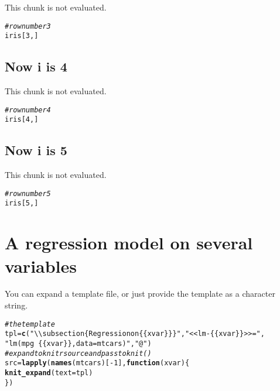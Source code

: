 \documentclass{article}\usepackage[]{graphicx}\usepackage[]{color}
\makeatletter
\newcommand{\hlnum}[1]{\textcolor[rgb]{0.686,0.059,0.569}{#1}}%
\newcommand{\hlstr}[1]{\textcolor[rgb]{0.192,0.494,0.8}{#1}}%
\newcommand{\hlcom}[1]{\textcolor[rgb]{0.678,0.584,0.686}{\textit{#1}}}%
\newcommand{\hlopt}[1]{\textcolor[rgb]{0,0,0}{#1}}%
\newcommand{\hlstd}[1]{\textcolor[rgb]{0.345,0.345,0.345}{#1}}%
\newcommand{\hlkwa}[1]{\textcolor[rgb]{0.161,0.373,0.58}{\textbf{#1}}}%
\newcommand{\hlkwb}[1]{\textcolor[rgb]{0.69,0.353,0.396}{#1}}%
\newcommand{\hlkwc}[1]{\textcolor[rgb]{0.333,0.667,0.333}{#1}}%
\newcommand{\hlkwd}[1]{\textcolor[rgb]{0.737,0.353,0.396}{\textbf{#1}}}%
\newenvironment{kframe}{%
 \def\at@end@of@kframe{}%
 \ifinner\ifhmode%
  \def\at@end@of@kframe{\end{minipage}}%
  \begin{minipage}{\columnwidth}%
 \fi\fi%
 \def\FrameCommand##1{\hskip\@totalleftmargin \hskip-\fboxsep
 \colorbox{shadecolor}{##1}\hskip-\fboxsep
     \hskip-\linewidth \hskip-\@totalleftmargin \hskip\columnwidth}%
 \MakeFramed {\advance\hsize-\width
   \@totalleftmargin\z@ \linewidth\hsize
   \@setminipage}}%
 {\par\unskip\endMakeFramed%
 \at@end@of@kframe}
\newenvironment{knitrout}{}{} %
\makeatother
\begin{document}
This chunk is not evaluated.
\begin{knitrout}
\color{fgcolor}\begin{kframe}
\begin{alltt}
\hlcom{# row number 3}
\hlstd{iris[}\hlnum{3}\hlstd{, ]}
\end{alltt}
\end{kframe}
\end{knitrout}
\subsection{Now i is 4}

This chunk is not evaluated.
\begin{knitrout}
\color{fgcolor}\begin{kframe}
\begin{alltt}
\hlcom{# row number 4}
\hlstd{iris[}\hlnum{4}\hlstd{, ]}
\end{alltt}
\end{kframe}
\end{knitrout}
\subsection{Now i is 5}

This chunk is not evaluated.
\begin{knitrout}
\color{fgcolor}\begin{kframe}
\begin{alltt}
\hlcom{# row number 5}
\hlstd{iris[}\hlnum{5}\hlstd{, ]}
\end{alltt}
\end{kframe}
\end{knitrout}

\section{A regression model on several variables}

You can expand a template file, or just provide the template as a character string.

\begin{knitrout}
\color{fgcolor}\begin{kframe}
\begin{alltt}
\hlcom{# the template}
\hlstd{tpl} \hlkwb{=} \hlkwd{c}\hlstd{(}\hlstr{"\textbackslash{}\textbackslash{}subsection\{Regression on \{\{xvar\}\}\}"}\hlstd{,} \hlstr{"<<lm-\{\{xvar\}\}>>="}\hlstd{,}
    \hlstr{"lm(mpg~\{\{xvar\}\}, data=mtcars)"}\hlstd{,} \hlstr{"@"}\hlstd{)}
\hlcom{# expand to knitr source and pass to knit()}
\hlstd{src} \hlkwb{=} \hlkwd{lapply}\hlstd{(}\hlkwd{names}\hlstd{(mtcars)[}\hlopt{-}\hlnum{1}\hlstd{],} \hlkwa{function}\hlstd{(}\hlkwc{xvar}\hlstd{) \{}
    \hlkwd{knit_expand}\hlstd{(}\hlkwc{text} \hlstd{= tpl)}
\hlstd{\})}
\end{alltt}
\end{kframe}
\end{knitrout}
\end{document}
